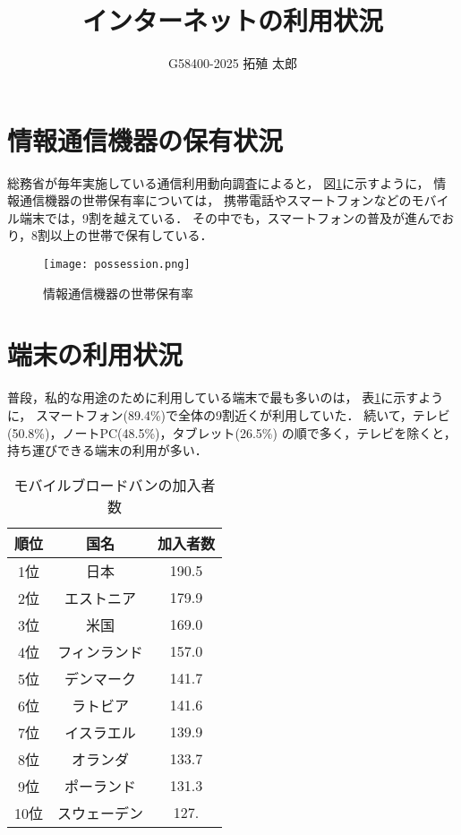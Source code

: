 \documentclass[a4paper,11pt,dvipdfmx]{ujarticle}
\title{インターネットの利用状況}
\author{G58400-2025 拓殖 太郎}
\begin{document}
\maketitle

\section{情報通信機器の保有状況}

総務省が毎年実施している通信利用動向調査\cite{soumu}によると，
図\ref{fig:保有率}に示すように，
情報通信機器の世帯保有率については，
携帯電話やスマートフォンなどのモバイル端末では，9割を越えている．
その中でも，スマートフォンの普及が進んでおり，8割以上の世帯で保有している．

\begin{figure}[htbp]
    \centering
    \texttt{[image: possession.png]}
    \caption{情報通信機器の世帯保有率}\label{fig:保有率}
\end{figure}

\section{端末の利用状況}

普段，私的な用途のために利用している端末で最も多いのは，
表\ref{tbl:利用状況}に示すように，
スマートフォン(89.4\%)で全体の9割近くが利用していた．
続いて，テレビ(50.8\%)，ノートPC(48.5\%)，タブレット(26.5\%)
の順で多く，テレビを除くと，持ち運びできる端末の利用が多い\cite{corona}．

\begin{table}[htbp]
    \centering
    \caption{モバイルブロードバンの加入者数}
    \label{tbl:利用状況}

    \begin{tabular}{|c|c|c|}
        \hline
        順位 & 国名 & 加入者数 \\
        \hline
        1位 & 日本 & 190.5\\
        \hline
        2位 & エストニア & 179.9\\
        \hline
        3位 & 米国 & 169.0\\
        \hline
        4位 & フィンランド & 157.0\\
        \hline
        5位 & デンマーク & 141.7\\
        \hline
        6位 & ラトビア & 141.6\\
        \hline 
        7位 & イスラエル & 139.9\\
        \hline
        8位 & オランダ & 133.7\\
        \hline
        9位 & ポーランド & 131.3\\
        \hline
        10位 & スウェーデン & 127.\\
        \hline
    \end{tabular}
\end{table}
\end{document}
